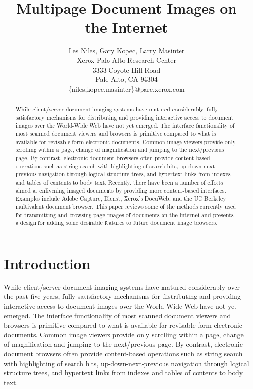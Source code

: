 
\title{Multipage Document Images on the Internet}
\author{Les Niles, Gary Kopec, Larry Masinter\\
Xerox Palo Alto Research Center\\
3333 Coyote Hill Road\\
Palo Alto, CA 94304\\
\{niles,kopec,masinter\}@parc.xerox.com}

\date{}
 

\maketitle

\begin{abstract}
While client/server document imaging systems have matured considerably,
fully satisfactory mechanisms for distributing and
providing interactive access to document images over the World-Wide Web
have not yet emerged. The interface functionality of most scanned document
viewers and browsers is primitive compared to what is available for
revisable-form electronic documents. Common image viewers provide only scrolling within a
page, change of magnification and jumping to the next/previous page.  By
contrast, electronic document browsers often provide content-based
operations such as string search with highlighting of search hits,
up-down-next-previous navigation through logical structure trees, and hypertext
links from indexes and tables of contents to body text. Recently,
there have been a number of efforts aimed at enlivening imaged documents by
providing more content-based interfaces. Examples include Adobe Capture,
Dienst, Xerox's DocuWeb, and the UC Berkeley multivalent
document browser. This paper reviews some of the methods currently used
for transmitting and browsing page images of documents on the Internet and
presents a design for adding some desirable features to 
future document image browsers.
\end{abstract}

\section{Introduction}

While client/server document imaging systems have matured considerably
over the past five years, fully satisfactory mechanisms for
distributing and providing interactive access to document images over
the World-Wide Web have not yet emerged. The interface functionality
of most scanned document viewers and browsers is primitive compared to
what is available for revisable-form electronic documents. Common image viewers
provide only scrolling within a page, change of magnification and
jumping to the next/previous page.  By contrast, electronic document
browsers often provide content-based operations such as string search
with highlighting of search hits, up-down-next-previous navigation
through logical structure trees, and hypertext links from indexes and
tables of contents to body text.

